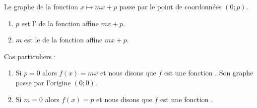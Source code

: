 \begin{Aretenir}
    Le graphe de la fonction \( x\mapsto mx+p\) passe par le point de coordonnées \( (0;p)\).
    \begin{enumerate}
        \item
            \( p\) est l' de la fonction affine \( mx+p\).
        \item
            \( m\) est le  de la fonction affine \( mx+p\).
    \end{enumerate}
\end{Aretenir}

Cas particuliers :
\begin{enumerate}
    \item
        Si \( p=0\) alors \( f(x)=mx\) et nous disons que \( f\) est une fonction . Son graphe passe par l'origine \( (0;0)\).
    \item
        Si \( m=0\) alors \( f(x)=p\) et nous disons que \( f\) est une fonction .
\end{enumerate}
